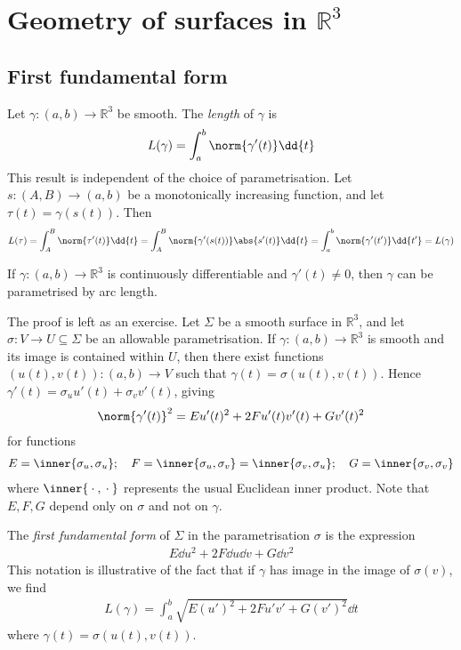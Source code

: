 \section{Geometry of surfaces in $\mathbb R^3$}

\subsection{First fundamental form}
Let $\gamma \colon (a,b) \to \mathbb R^3$ be smooth.
The \textit{length} of $\gamma$ is
\begin{align*}
	L(\gamma) = \int_a^b \norm{\gamma'(t)} \dd{t}
\end{align*}
This result is independent of the choice of parametrisation.
Let $s \colon (A,B) \to (a,b)$ be a monotonically increasing function, and let $\tau(t) = \gamma(s(t))$.
Then
\begin{align*}
	L(\tau) = \int_A^B \norm{\tau'(t)} \dd{t} = \int_A^B \norm{\gamma'(s(t))} \abs{s'(t)} \dd{t} = \int_a^b \norm{\gamma'(t')} \dd{t'} = L(\gamma)
\end{align*}
\begin{lemma}
	If $\gamma \colon (a,b) \to \mathbb R^3$ is continuously differentiable and $\gamma'(t) \neq 0$, then $\gamma$ can be parametrised by arc length.
\end{lemma}
The proof is left as an exercise.
Let $\Sigma$ be a smooth surface in $\mathbb R^3$, and let $\sigma \colon V \to U \subseteq \Sigma$ be an allowable parametrisation.
If $\gamma \colon (a,b) \to \mathbb R^3$ is smooth and its image is contained within $U$, then there exist functions $(u(t), v(t)) \colon (a,b) \to V$ such that $\gamma(t) = \sigma(u(t), v(t))$.
Hence $\gamma'(t) = \sigma_u u'(t) + \sigma_v v'(t)$, giving
\begin{align*}
	\norm{\gamma'(t)}^2 = E u'(t)^2 + 2F u'(t) v'(t) + G v'(t)^2
\end{align*}
for functions
\begin{align*}
	E = \inner{\sigma_u, \sigma_u};\quad F = \inner{\sigma_u, \sigma_v} = \inner{\sigma_v, \sigma_u};\quad G = \inner{\sigma_v, \sigma_v}
\end{align*}
where $\inner{\wildcard,\wildcard}$ represents the usual Euclidean inner product.
Note that $E, F, G$ depend only on $\sigma$ and not on $\gamma$.
\begin{definition}
	The \textit{first fundamental form} of $\Sigma$ in the parametrisation $\sigma$ is the expression
	\begin{align*}
		E \dd{u}^2 + 2F \dd{u} \dd{v} + G \dd{v}^2
	\end{align*}
	This notation is illustrative of the fact that if $\gamma$ has image in the image of $\sigma(v)$, we find
	\begin{align*}
		L(\gamma) = \int_a^b \sqrt{E (u')^2 + 2F u'v' + G (v')^2} \dd{t}
	\end{align*}
	where $\gamma(t) = \sigma(u(t),v(t))$.
\end{definition}
